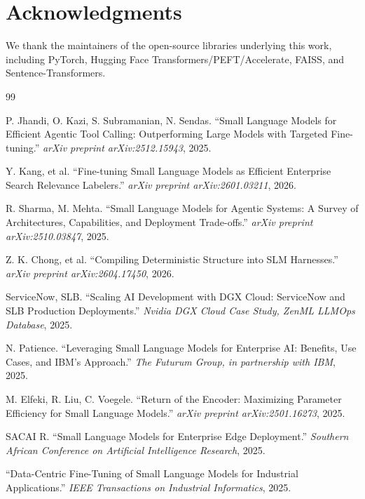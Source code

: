\documentclass[11pt]{article}
\begin{document}
\section*{Acknowledgments}
We thank the maintainers of the open-source libraries underlying this work,
including PyTorch, Hugging Face Transformers/PEFT/Accelerate, FAISS, and
Sentence-Transformers.


\begin{thebibliography}{99}

 P. Jhandi, O. Kazi, S. Subramanian, N. Sendas.
``Small Language Models for Efficient Agentic Tool Calling: Outperforming
Large Models with Targeted Fine-tuning.'' \emph{arXiv preprint
arXiv:2512.15943}, 2025.

 Y. Kang, et al. ``Fine-tuning Small Language
Models as Efficient Enterprise Search Relevance Labelers.'' \emph{arXiv
preprint arXiv:2601.03211}, 2026.

 R. Sharma, M. Mehta. ``Small Language Models for
Agentic Systems: A Survey of Architectures, Capabilities, and Deployment
Trade-offs.'' \emph{arXiv preprint arXiv:2510.03847}, 2025.

 Z. K. Chong, et al. ``Compiling Deterministic
Structure into SLM Harnesses.'' \emph{arXiv preprint arXiv:2604.17450}, 2026.

 ServiceNow, SLB. ``Scaling AI Development with
DGX Cloud: ServiceNow and SLB Production Deployments.'' \emph{Nvidia DGX
Cloud Case Study, ZenML LLMOps Database}, 2025.

 N. Patience. ``Leveraging Small Language Models
for Enterprise AI: Benefits, Use Cases, and IBM's Approach.'' \emph{The
Futurum Group, in partnership with IBM}, 2025.

 M. Elfeki, R. Liu, C. Voegele. ``Return of the
Encoder: Maximizing Parameter Efficiency for Small Language Models.''
\emph{arXiv preprint arXiv:2501.16273}, 2025.

 SACAI R. ``Small Language Models for Enterprise
Edge Deployment.'' \emph{Southern African Conference on Artificial
Intelligence Research}, 2025.

 ``Data-Centric Fine-Tuning of Small
Language Models for Industrial Applications.'' \emph{IEEE Transactions on
Industrial Informatics}, 2025.


\end{thebibliography}
\end{document}
